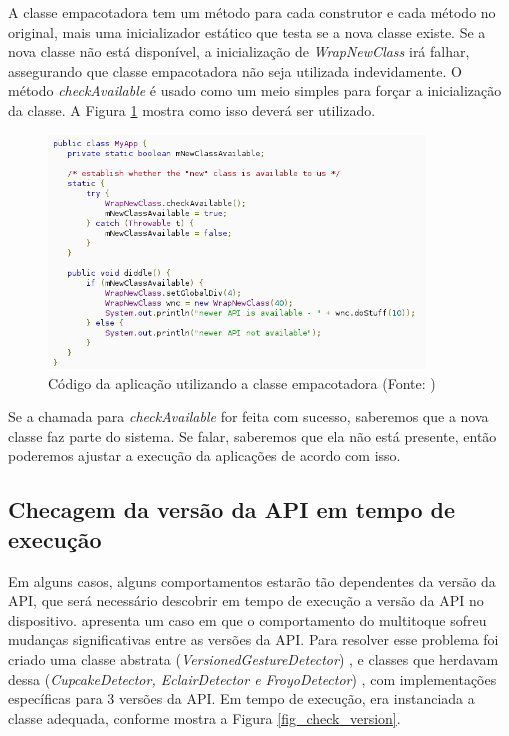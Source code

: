 A classe empacotadora tem um método para cada construtor e cada método no original,
mais uma inicializador estático que testa se a nova classe existe. Se a nova classe
não está disponível, a inicialização de {\it WrapNewClass} irá falhar, assegurando
que classe empacotadora não seja utilizada indevidamente. O método {\it checkAvailable} 
é usado como um meio simples para forçar a inicialização da classe. A Figura \ref{wrapper3}
mostra como isso deverá ser utilizado.

\begin{figure}[h]
    \centering
    \includegraphics[width=10cm]{img/wrapper3}
    \caption[Código da aplicação utilizando a classe empacotadora]{Código da aplicação utilizando a classe empacotadora (Fonte: \cite{back_compat})}
    \label{wrapper3}
\end{figure}

Se a chamada para {\it checkAvailable} for feita com sucesso, saberemos que a nova
classe faz parte do sistema. Se falar, saberemos que ela não está presente, então
poderemos ajustar a execução da aplicações de acordo com isso.

\subsection{Checagem da versão da API em tempo de execução}

Em alguns casos, alguns comportamentos estarão tão dependentes da versão da API, que
será necessário descobrir em tempo de execução a versão da API no dispositivo.
\cite{check_version} apresenta um caso em que o comportamento do multitoque sofreu mudanças significativas
entre as versões da API. Para resolver esse problema foi criado uma classe abstrata ({\it VersionedGestureDetector}) ,
e classes que herdavam dessa ({\it CupcakeDetector, EclairDetector e FroyoDetector}) , com implementações específicas para 3 versões da API.
Em tempo de execução, era instanciada a classe adequada, conforme mostra a Figura
\ref{fig_check_version}.

